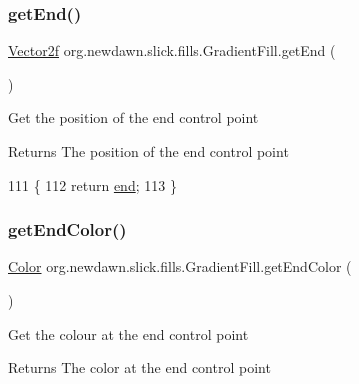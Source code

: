 \subsubsection{\texorpdfstring{get\+End()}{getEnd()}}
{\footnotesize\ttfamily \mbox{\hyperlink{classorg_1_1newdawn_1_1slick_1_1geom_1_1_vector2f}{Vector2f}} org.\+newdawn.\+slick.\+fills.\+Gradient\+Fill.\+get\+End (\begin{DoxyParamCaption}{ }\end{DoxyParamCaption})\hspace{0.3cm}{\ttfamily [inline]}}

Get the position of the end control point

\begin{DoxyReturn}{Returns}
The position of the end control point 
\end{DoxyReturn}

\begin{DoxyCode}
111                              \{
112         \textcolor{keywordflow}{return} \mbox{\hyperlink{classorg_1_1newdawn_1_1slick_1_1fills_1_1_gradient_fill_ad061e535f20522d5170bfad1354480c6}{end}};
113     \}
\end{DoxyCode}
\mbox{\label{classorg_1_1newdawn_1_1slick_1_1fills_1_1_gradient_fill_ae5f263ece60cca9489f97137970d659a}} 
\subsubsection{\texorpdfstring{get\+End\+Color()}{getEndColor()}}
{\footnotesize\ttfamily \mbox{\hyperlink{classorg_1_1newdawn_1_1slick_1_1_color}{Color}} org.\+newdawn.\+slick.\+fills.\+Gradient\+Fill.\+get\+End\+Color (\begin{DoxyParamCaption}{ }\end{DoxyParamCaption})\hspace{0.3cm}{\ttfamily [inline]}}

Get the colour at the end control point

\begin{DoxyReturn}{Returns}
The color at the end control point 
\end{DoxyReturn}

